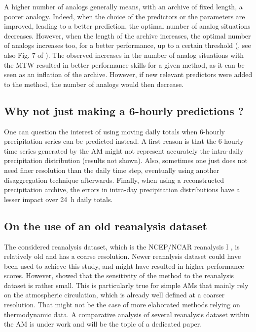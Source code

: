 \documentclass[hess, manuscript]{copernicus}
\begin{document}
A higher number of analogs generally means, with an archive of fixed length, a poorer analogy. Indeed, when the choice of the predictors or the parameters are improved, leading to a better prediction, the optimal number of analog situations decreases. However, when the length of the archive increases, the optimal number of analogs increases too, for a better performance, up to a certain threshold (\citealt{Bontron2004}, see also Fig. 7 of \citealt{Hamill2006a}). The observed increases in the number of analog situations with the MTW resulted in better performance skills for a given method, as it can be seen as an inflation of the archive. However, if new relevant predictors were added to the method, the number of analogs would then decrease.


\subsection{Why not just making a 6-hourly predictions ?}

One can question the interest of using moving daily totals when 6-hourly precipitation series can be predicted instead. A first reason is that the 6-hourly time series generated by the AM might not represent accurately the intra-daily precipitation distribution (results not shown). Also, sometimes one just does not need finer resolution than the daily time step, eventually using another disaggregation technique afterwards. Finally, when using a reconstructed precipitation archive, the errors in intra-day precipitation distributions have a lesser impact over 24~h daily totals.


\subsection{On the use of an old reanalysis dataset}
\label{sec:old_reanalysis}

The considered reanalysis dataset, which is the NCEP/NCAR reanalysis I \citep{Kalnay1996}, is relatively old and has a coarse resolution. Newer reanalysis dataset could have been used to achieve this study, and might have resulted in higher performance scores. However, \cite{BenDaoud2009} showed that the sensitivity of the method to the reanalysis dataset is rather small. This is particularly true for simple AMs that mainly rely on the atmospheric circulation, which is already well defined at a coarser resolution. That might not be the case of more elaborated methods relying on thermodynamic data. A comparative analysis of several reanalysis dataset within the AM is under work and will be the topic of a dedicated paper.
\end{document}
